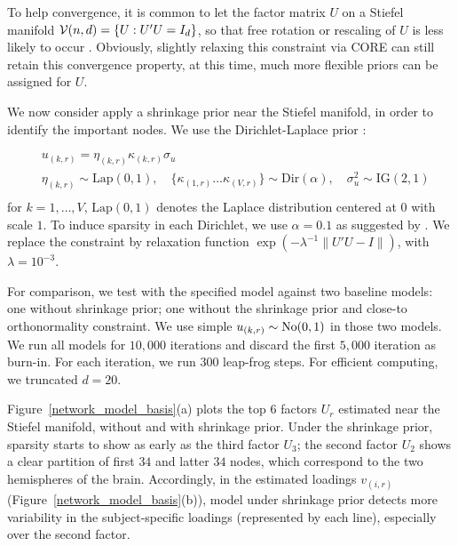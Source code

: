 \documentclass[10pt,fleqn]{article}
\DeclareMathOperator{\1}{\mathbbm{1}} \DeclareMathOperator{\bigO}{\mc O}
\begin{document}
To help convergence, it is common to let the factor matrix $U$ on a Stiefel manifold $\mathcal{V}(n,d)=\{U: U'U=I_d\}$, so that free rotation or rescaling of $U$ is less likely to  occur \citep{hoff2016equivariant}. Obviously, slightly relaxing this constraint via CORE can still retain this convergence property, at this time, much more flexible priors can be assigned for $U$.



We now consider apply a shrinkage prior near the Stiefel manifold, in order to  identify the important nodes. We use the Dirichlet-Laplace prior \citep{bhattacharya2015dirichlet}:

\begin{equation*} \begin{aligned}
& u_{(k,r)}= \eta_{(k,r)}\kappa_{(k,r)}\sigma_{u} \\
&
\eta_{(k,r)}\sim \text{Lap}(0,1), \quad \{\kappa_{(1,r)}\ldots
\kappa_{(V,r)}\} \sim \text{Dir}(\alpha), \quad \sigma^2_{u}\sim
\text{IG}(2,1)                                     \\\end{aligned} \end{equation*}
for $k=1,\ldots, V$,  $\text{Lap}(0,1)$ denotes the
Laplace distribution centered at $0$ with scale $1$. To induce sparsity in each Dirichlet, we use $\alpha=0.1$ as
suggested by \cite{bhattacharya2015dirichlet}. We replace the constraint by relaxation function $\exp( - \lambda^{-1} \|U'U-I\|)$, with $\lambda=10^{-3}$.

For comparison, we test with the specified model against two baseline
models:
one without
shrinkage prior; one without the shrinkage prior and
close-to orthonormality constraint. We use simple $u_{(k,r)}\sim\operatorname{No}(0,1)$ in those two models. We run all
models for $10,000$ iterations and discard the first $5,000$ iteration as
burn-in.  For each iteration, we run $300$ leap-frog steps. For efficient
computing, we truncated $d=20$.

Figure~\ref{network_model_basis}(a) plots the top $6$ factors $U_r$ estimated near the Stiefel manifold, without and with shrinkage prior. Under the shrinkage prior, sparsity starts to show as early as the third factor $U_3$; the second factor $U_2$ shows a clear partition of first $34$ and latter $34$ nodes, which correspond to the two hemispheres of the brain. Accordingly, in the estimated loadings $v_{(i,r) }$ (Figure~\ref{network_model_basis}(b)), model under shrinkage prior detects more variability in the subject-specific loadings (represented by each line), especially over the second factor.
\end{document}
